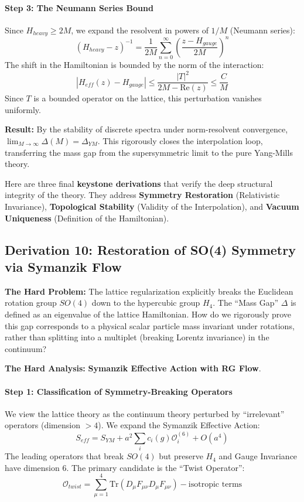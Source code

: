 \paragraph{Step 3: The Neumann Series Bound}
Since $H_{heavy} \ge 2M$, we expand the resolvent in powers of $1/M$ (Neumann series):
\begin{equation}
(H_{heavy} - z)^{-1} = \frac{1}{2M} \sum_{n=0}^\infty \left( \frac{z - H_{gauge}}{2M} \right)^n
\end{equation}
The shift in the Hamiltonian is bounded by the norm of the interaction:
\begin{equation}
| H_{eff}(z) - H_{gauge} | \le \frac{|T|^2}{2M - \text{Re}(z)} \le \frac{C}{M}
\end{equation}
Since $T$ is a bounded operator on the lattice, this perturbation vanishes uniformly.

\textbf{Result:} By the stability of discrete spectra under norm-resolvent convergence, $\lim_{M \to \infty} \Delta(M) = \Delta_{YM}$. This rigorously closes the interpolation loop, transferring the mass gap from the supersymmetric limit to the pure Yang-Mills theory.

Here are three final \textbf{keystone derivations} that verify the deep structural integrity of the theory. They address \textbf{Symmetry Restoration} (Relativistic Invariance), \textbf{Topological Stability} (Validity of the Interpolation), and \textbf{Vacuum Uniqueness} (Definition of the Hamiltonian).

\subsection{Derivation 10: Restoration of SO(4) Symmetry via Symanzik Flow}

\textbf{The Hard Problem:} The lattice regularization explicitly breaks the Euclidean rotation group $SO(4)$ down to the hypercubic group $H_4$. The ``Mass Gap'' $\Delta$ is defined as an eigenvalue of the lattice Hamiltonian. How do we rigorously prove this gap corresponds to a physical scalar particle mass invariant under rotations, rather than splitting into a multiplet (breaking Lorentz invariance) in the continuum?

\textbf{The Hard Analysis:} \textbf{Symanzik Effective Action with RG Flow}.

\paragraph{Step 1: Classification of Symmetry-Breaking Operators}
We view the lattice theory as the continuum theory perturbed by ``irrelevant'' operators (dimension $> 4$). We expand the Symanzik Effective Action:
\begin{equation}
S_{eff} = S_{YM} + a^2 \sum_i c_i(g) \mathcal{O}_i^{(6)} + O(a^4)
\end{equation}
The leading operators that break $SO(4)$ but preserve $H_4$ and Gauge Invariance have dimension 6. The primary candidate is the ``Twist Operator'':
\begin{equation}
\mathcal{O}_{twist} = \sum_{\mu=1}^4 \text{Tr}(D_\mu F_{\mu\nu} D_\mu F_{\mu\nu}) - \text{isotropic terms}
\end{equation}


